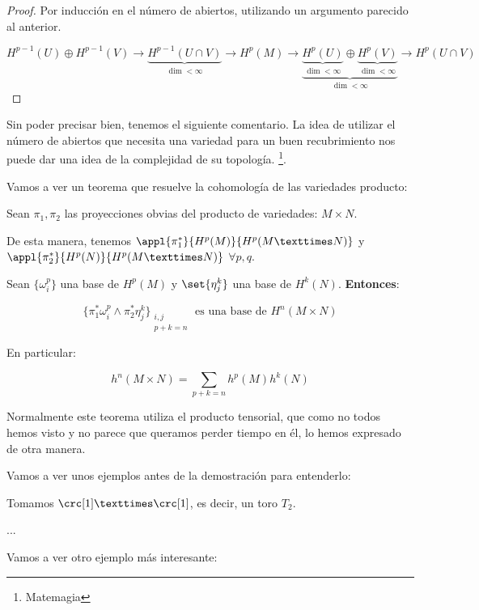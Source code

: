 \documentclass[palatino, bibnumbers]{apuntes}
\begin{document}
\begin{proof}
Por inducción en el número de abiertos, utilizando un argumento parecido al anterior.

\begin{equation}
\label{juliantolai:1}
H^{p-1}(U) \oplus H^{p-1}(V) \to \underbrace{H^{p-1}(U\cap V)}_{\dim{} < ∞} \to H^p(M) \to \underbrace{\underbrace{H^{p}(U)}_{\dim < ∞} \oplus \underbrace{H^p(V)}_{\dim{} < ∞}}_{\dim < ∞} \to H^p(U\cap V)
\end{equation}

\end{proof}

\obs Sin poder precisar bien, tenemos el siguiente comentario. La idea de utilizar el número de abiertos que necesita una variedad para un buen recubrimiento nos puede dar una idea de la complejidad de su topología. \footnote{Matemagia}.


Vamos a ver un teorema que resuelve la cohomología de las variedades producto:
\begin{theorem}
Sean $π_1,π_2$ las proyecciones obvias del producto de variedades: $M\times N$.

De esta manera, tenemos $\appl{\pi_1^\ast}{H^p(M)}{H^p(M×N)}$ y $\appl{\pi_2^\ast}{H^p(N)}{H^p(M×N)}$ $∀p,q$.

Sean $\{ω_i^p\}$ una base de $H^p(M)$ y $\set{\eta_j^k}$ una base de $H^k(N)$. \textbf{Entonces}:

\[
	\{π_1^\ast ω_i^p ∧ π_2^\ast \eta_j^k\}_{\begin{array}{c}i,j\\p+k=n\end{array}} \text{ es una base de } H^n(M×N)
\]

En particular:

\[h^n(M×N) = \sum_{p+k=n} h^p(M)h^k(N)\]

\end{theorem}

\obs Normalmente este teorema utiliza el producto tensorial, que como no todos hemos visto y no parece que queramos perder tiempo en él, lo hemos expresado de otra manera.

Vamos a ver unos ejemplos antes de la demostración para entenderlo:


\begin{example}
Tomamos $\crc[1]×\crc[1]$, es decir, un toro $T_2$.

...
\end{example}

Vamos a ver otro ejemplo más interesante:
\end{document}
